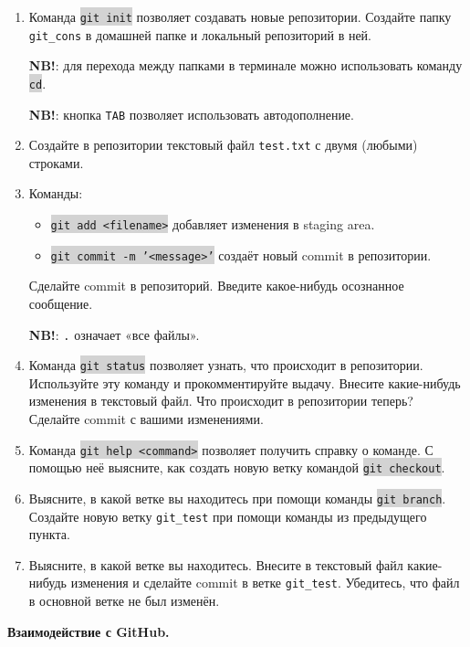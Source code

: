 \documentclass[10pt, a4paper]{extarticle}
\newcommand{\code}[1]{\colorbox{lightgray}{{\tt #1}}}
\begin{document}
	\begin{enumerate}
		\item Команда \code{git init} позволяет создавать новые репозитории. Создайте папку {\tt git\_cons} в домашней папке и локальный репозиторий в ней.
		
		\textbf{NB!}: для перехода между папками в терминале можно использовать команду \code{cd}.
		
		\textbf{NB!}: кнопка {\tt TAB} позволяет использовать автодополнение.
		
		\item Создайте в репозитории текстовый файл {\tt test.txt} с двумя (любыми) строками.
		\item Команды:
			\begin{itemize}
				\item \code{git add <filename>} добавляет изменения в staging area.
				\item \code{git commit -m '<message>'} создаёт новый commit в репозитории. 
			\end{itemize}
		Сделайте commit в репозиторий. Введите какое-нибудь осознанное сообщение.
		
		\textbf{NB!}: {\tt .} означает «все файлы».
		
		\item Команда \code{git status} позволяет узнать, что происходит в репозитории. Используйте эту команду и прокомментируйте выдачу. Внесите какие-нибудь изменения в текстовый файл. Что происходит в репозитории теперь? Сделайте commit с вашими изменениями.
		\item Команда \code{git help <command>} позволяет получить справку о команде. С помощью неё выясните, как создать новую ветку командой \code{git checkout}.
		\item Выясните, в какой ветке вы находитесь при помощи команды \code{git branch}. Создайте новую ветку {\tt git\_test} при помощи команды из предыдущего пункта.
		\item Выясните, в какой ветке вы находитесь. Внесите в текстовый файл какие-нибудь изменения и сделайте commit в ветке {\tt git\_test}. Убедитесь, что файл в основной ветке не был изменён. 
	\end{enumerate}
	
	\vspace{1em}
	
	{\Large \textbf{Взаимодействие с GitHub.}}
	
\end{document}

